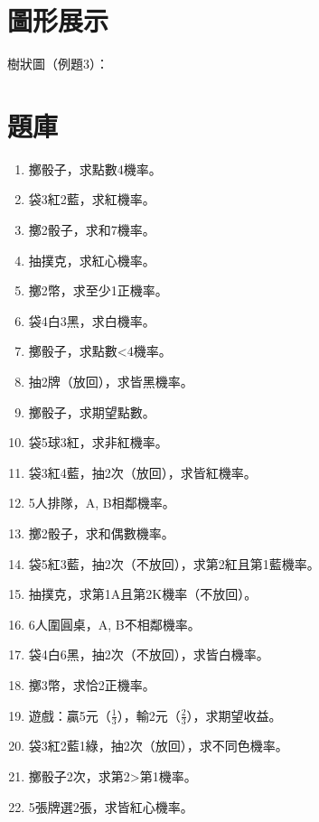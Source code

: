 \section{圖形展示}
樹狀圖（例題3）：

\section{題庫}
\begin{enumerate}[label=\arabic*.]
    \item 擲骰子，求點數4機率。
    \item 袋3紅2藍，求紅機率。
    \item 擲2骰子，求和7機率。
    \item 抽撲克，求紅心機率。
    \item 擲2幣，求至少1正機率。
    \item 袋4白3黑，求白機率。
    \item 擲骰子，求點數<4機率。
    \item 抽2牌（放回），求皆黑機率。
    \item 擲骰子，求期望點數。
    \item 袋5球3紅，求非紅機率。
    \item 袋3紅4藍，抽2次（放回），求皆紅機率。
    \item 5人排隊，A, B相鄰機率。
    \item 擲2骰子，求和偶數機率。
    \item 袋5紅3藍，抽2次（不放回），求第2紅且第1藍機率。
    \item 抽撲克，求第1A且第2K機率（不放回）。
    \item 6人圍圓桌，A, B不相鄰機率。
    \item 袋4白6黑，抽2次（不放回），求皆白機率。
    \item 擲3幣，求恰2正機率。
    \item 遊戲：贏5元（$\frac{1}{3}$），輸2元（$\frac{2}{3}$），求期望收益。
    \item 袋3紅2藍1綠，抽2次（放回），求不同色機率。
    \item 擲骰子2次，求第2>第1機率。
    \item 5張牌選2張，求皆紅心機率。

\end{enumerate}
